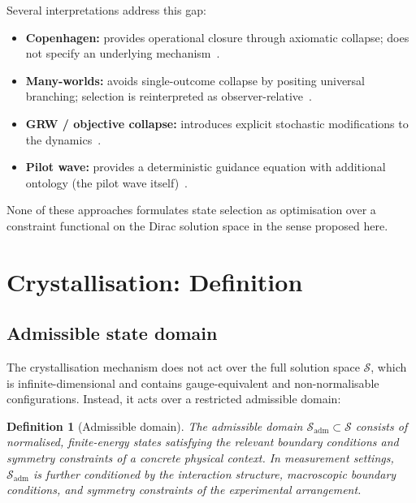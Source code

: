\documentclass[12pt]{article}
\newtheorem{definition}[theorem]{Definition}
\begin{document}
Several interpretations address this gap:
\begin{itemize}
    \item \textbf{Copenhagen:} provides operational closure through axiomatic collapse; does not specify an underlying mechanism~\citep{vonNeumann1932}.
    \item \textbf{Many-worlds:} avoids single-outcome collapse by positing universal branching; selection is reinterpreted as observer-relative~\citep{Everett1957}.
    \item \textbf{GRW / objective collapse:} introduces explicit stochastic modifications to the dynamics~\citep{GRW1986}.
    \item \textbf{Pilot wave:} provides a deterministic guidance equation with additional ontology (the pilot wave itself)~\citep{Bohm1952}.
\end{itemize}

None of these approaches formulates state selection as optimisation over a constraint functional on the Dirac solution space in the sense proposed here.

\section{Crystallisation: Definition}\label{sec:crystallisation}

\subsection{Admissible state domain}

The crystallisation mechanism does not act over the full solution space $\mathcal{S}$, which is infinite-dimensional and contains gauge-equivalent and non-normalisable configurations. Instead, it acts over a restricted admissible domain:

\begin{definition}[Admissible domain]\label{def:admissible}
The admissible domain $\mathcal{S}_{\mathrm{adm}} \subset \mathcal{S}$ consists of normalised, finite-energy states satisfying the relevant boundary conditions and symmetry constraints of a concrete physical context. In measurement settings, $\mathcal{S}_{\mathrm{adm}}$ is further conditioned by the interaction structure, macroscopic boundary conditions, and symmetry constraints of the experimental arrangement.
\end{definition}
\end{document}
